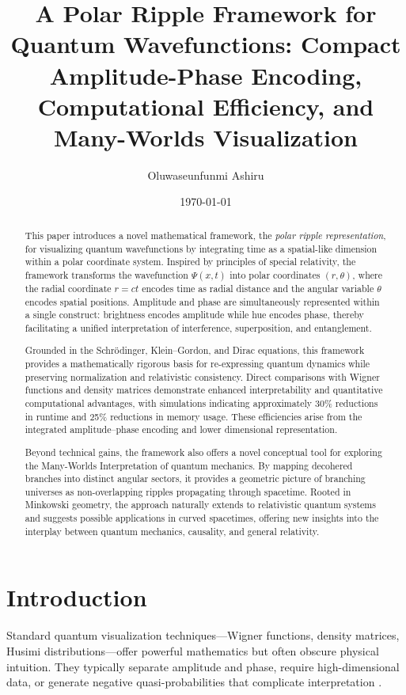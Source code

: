 \documentclass{article}
\begin{document}
\title{A Polar Ripple Framework for Quantum Wavefunctions: Compact Amplitude-Phase Encoding, Computational Efficiency, and Many-Worlds Visualization}
\author{Oluwaseunfunmi Ashiru}
\date{\today}
\maketitle 

\begin{abstract}
This paper introduces a novel mathematical framework, the \emph{polar ripple representation}, for visualizing quantum wavefunctions by integrating time as a spatial-like dimension within a polar coordinate system. Inspired by principles of special relativity, the framework transforms the wavefunction \(\Psi(x,t)\) into polar coordinates \((r,\theta)\), where the radial coordinate \(r=ct\) encodes time as radial distance and the angular variable \(\theta\) encodes spatial positions. Amplitude and phase are simultaneously represented within a single construct: brightness encodes amplitude while hue encodes phase, thereby facilitating a unified interpretation of interference, superposition, and entanglement.

Grounded in the Schrödinger, Klein--Gordon, and Dirac equations, this framework provides a mathematically rigorous basis for re-expressing quantum dynamics while preserving normalization and relativistic consistency. Direct comparisons with Wigner functions and density matrices demonstrate enhanced interpretability and quantitative computational advantages, with simulations indicating approximately 30\% reductions in runtime and 25\% reductions in memory usage. These efficiencies arise from the integrated amplitude--phase encoding and lower dimensional representation.
    
Beyond technical gains, the framework also offers a novel conceptual tool for exploring the Many-Worlds Interpretation of quantum mechanics. By mapping decohered branches into distinct angular sectors, it provides a geometric picture of branching universes as non-overlapping ripples propagating through spacetime. Rooted in Minkowski geometry, the approach naturally extends to relativistic quantum systems and suggests possible applications in curved spacetimes, offering new insights into the interplay between quantum mechanics, causality, and general relativity.
\end{abstract}

\newpage
\tableofcontents
\newpage

\section{Introduction}
Standard quantum visualization techniques—Wigner functions, density matrices, Husimi distributions—offer powerful mathematics but often obscure physical intuition. They typically separate amplitude and phase, require high-dimensional data, or generate negative quasi-probabilities that complicate interpretation \cite{wigner1932,vonNeumann1932}.
\end{document}
